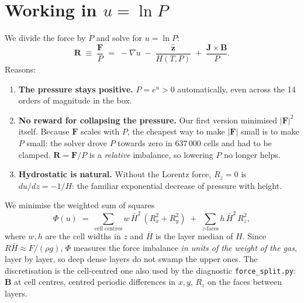 \documentclass[10pt]{extarticle}
\newcommand{\B}{\mathbf B}\newcommand{\J}{\mathbf J}\newcommand{\F}{\mathbf F}\newcommand{\zh}{\hat{\mathbf z}}
\begin{document}
\section{Working in $u=\ln P$}
We divide the force by $P$ and solve for $u=\ln P$:
\[
\mathbf R \;\equiv\; \frac{\F}{P} \;=\; -\nabla u \;-\; \frac{\zh}{H(T,P)} \;+\; \frac{\J\times\B}{P}.
\]
Reasons:
\begin{enumerate}
\item \textbf{The pressure stays positive.} $P=e^u>0$ automatically, even across the 14 orders of magnitude in the box.
\item \textbf{No reward for collapsing the pressure.} Our first version minimised $|\F|^2$ itself. Because $\F$ scales
with $P$, the cheapest way to make $|\F|$ small is to make $P$ small: the solver drove $P$ towards zero in 637\,000 cells
and had to be clamped. $\mathbf R=\F/P$ is a \emph{relative} imbalance, so lowering $P$ no longer helps.
\item \textbf{Hydrostatic is natural.} Without the Lorentz force, $R_z=0$ is $du/dz=-1/H$: the familiar exponential
decrease of pressure with height.
\end{enumerate}
We minimise the weighted sum of squares
\[
\Phi(u) \;=\; \sum_{\text{cell centres}} w\,\bar H^2\,(R_x^2+R_y^2) \;+\; \sum_{z\text{-faces}} h\,\bar H^2\,R_z^2 ,
\]
where $w,h$ are the cell widths in $z$ and $\bar H$ is the layer median of $H$. Since $R\bar H\approx F/(\rho g)$, $\Phi$
measures the force imbalance \emph{in units of the weight of the gas}, layer by layer, so deep dense layers do not swamp
the upper ones. The discretisation is the cell-centred one also used by the diagnostic \texttt{force\_split.py}: $\B$ at
cell centres, centred periodic differences in $x,y$, $R_z$ on the faces between layers.
\end{document}
